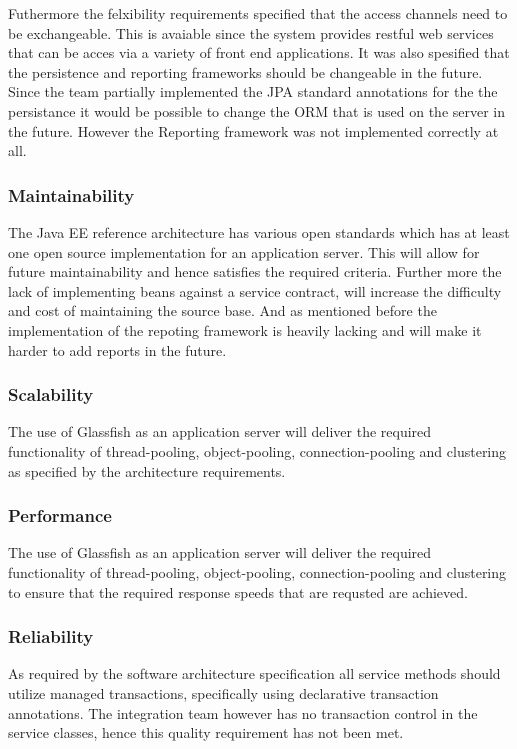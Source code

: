 \documentclass[a4paper,10pt]{article}
\begin{document}
Futhermore the felxibility requirements specified that the access channels need to be exchangeable.
This is avaiable since the system provides restful web services that can be acces via a variety of front end applications. 
It was also spesified that the persistence and reporting frameworks should be changeable in the future. Since the team partially implemented the JPA standard annotations for
the the persistance it would be possible to change the ORM that is used on the server in the future. However the Reporting framework was not implemented correctly at all.

\subsubsection{Maintainability}
The Java EE reference architecture has various open standards which has at least one open source implementation for an application server. This will allow for future maintainability and hence satisfies the required criteria.  Further more the lack of implementing beans against a service contract, will increase the difficulty and cost of maintaining the source base.
And as mentioned before the implementation of the repoting framework is heavily lacking and will make it harder to add reports in the future.

\subsubsection{Scalability}
The use of Glassfish as an application server will deliver the required functionality of thread-pooling, object-pooling, connection-pooling and clustering as specified by the architecture requirements.

\subsubsection{Performance}
The use of Glassfish as an application server will deliver the required functionality of thread-pooling, object-pooling, connection-pooling and clustering to ensure that the required response speeds that are requsted are achieved.

\subsubsection{Reliability}
As required by the software architecture specification all service methods should utilize managed transactions, specifically using declarative transaction annotations. The integration team however has no transaction control in the service classes, hence this quality requirement has not been met.
\end{document}
